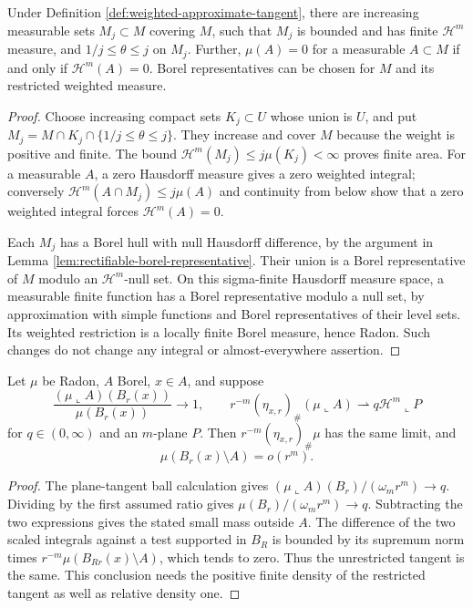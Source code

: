 \begin{lemma}\label{lem:positive-weight-area-exhaustion}
Under Definition \ref{def:weighted-approximate-tangent}, there are increasing measurable sets $M_j\subset M$ covering $M$, such that $M_j$ is bounded and has finite $\mathcal H^m$ measure, and $1/j\leq\theta\leq j$ on $M_j$. Further, $\mu(A)=0$ for a measurable $A\subset M$ if and only if $\mathcal H^m(A)=0$. Borel representatives can be chosen for $M$ and its restricted weighted measure.
\end{lemma}
\begin{proof}
Choose increasing compact sets $K_j\subset U$ whose union is $U$, and put $M_j=M\cap K_j\cap\{1/j\leq\theta\leq j\}$. They increase and cover $M$ because the weight is positive and finite. The bound $\mathcal H^m(M_j)\leq j\mu(K_j)<\infty$ proves finite area. For a measurable $A$, a zero Hausdorff measure gives a zero weighted integral; conversely $\mathcal H^m(A\cap M_j)\leq j\mu(A)$ and continuity from below show that a zero weighted integral forces $\mathcal H^m(A)=0$.

Each $M_j$ has a Borel hull with null Hausdorff difference, by the argument in Lemma \ref{lem:rectifiable-borel-representative}. Their union is a Borel representative of $M$ modulo an $\mathcal H^m$-null set. On this sigma-finite Hausdorff measure space, a measurable finite function has a Borel representative modulo a null set, by approximation with simple functions and Borel representatives of their level sets. Its weighted restriction is a locally finite Borel measure, hence Radon. Such changes do not change any integral or almost-everywhere assertion.
\end{proof}

\begin{lemma}\label{lem:tangent-full-density-restriction}
Let $\mu$ be Radon, $A$ Borel, $x\in A$, and suppose
\[
 \frac{(\mu\llcorner A)(B_r(x))}{\mu(B_r(x))}\to1,
 \qquad r^{-m}(\eta_{x,r})_\#(\mu\llcorner A)
 \rightharpoonup q\mathcal H^m\llcorner P
\]
for $q\in(0,\infty)$ and an $m$-plane $P$. Then $r^{-m}(\eta_{x,r})_\#\mu$ has the same limit, and
\[
 \mu(B_r(x)\setminus A)=o(r^m).
\]
\end{lemma}
\begin{proof}
The plane-tangent ball calculation gives $(\mu\llcorner A)(B_r)/(\omega_mr^m)\to q$. Dividing by the first assumed ratio gives $\mu(B_r)/(\omega_mr^m)\to q$. Subtracting the two expressions gives the stated small mass outside $A$. The difference of the two scaled integrals against a test supported in $B_R$ is bounded by its supremum norm times $r^{-m}\mu(B_{Rr}(x)\setminus A)$, which tends to zero. Thus the unrestricted tangent is the same. This conclusion needs the positive finite density of the restricted tangent as well as relative density one.
\end{proof}

